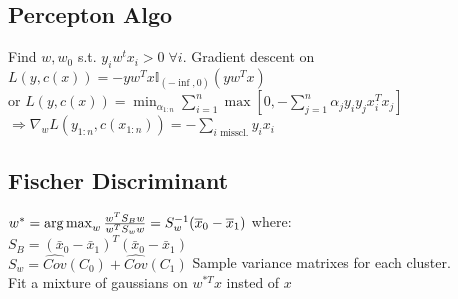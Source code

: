 \subsection*{Percepton Algo} 
Find \(w, w_0\) s.t. \(y_iw^tx_i > 0 \;\forall i\). Gradient descent on \(L(y,c(x))=-yw^Tx\mathbb{I}_{\left(-\inf, 0\right)}\left(yw^Tx\right)\)\\
or {\scriptsize $L(y,c(x)) = \min_{\alpha_{1:n}} \sum_{i=1}^n \max  [0,- \sum_{j=1}^n \alpha_j y_i y_j x_i^T x_j ]$}
$\Rightarrow \nabla_w L(y_{1:n},c(x_{1:n})) = -\sum_{i \text{ misscl.}}y_ix_i$

\subsection*{Fischer Discriminant}
\(w^{*} = \operatorname*{arg\,max}_w \frac{w^TS_Bw}{w^TS_ww} = S_w^{-1}(\overline{x}_0-\overline{x}_1)\) where: \\
$S_B = (\bar{x}_0-\bar{x}_1)^T(\bar{x}_0-\bar{x}_1)$\\
\(S_w=\hat{Cov}(C_0) + \hat{Cov}(C_1)\) Sample variance matrixes for each cluster.\\
Fit a mixture of gaussians on $w^{*T}x$ insted of $x$

